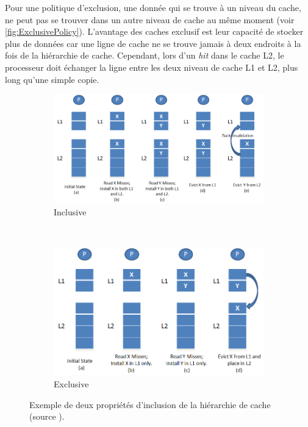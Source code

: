 Pour une politique d'exclusion, une donnée qui se trouve à un niveau du cache, ne peut pas se trouver dans un autre niveau de cache au même moment (voir \autoref{fig:ExclusivePolicy}). L'avantage des caches exclusif est leur capacité de stocker plus de données car une ligne de cache ne se trouve jamais à deux endroits à la fois de la hiérarchie de cache. Cependant, lors d'un \textit{hit} dans le cache L2, le processeur doit échanger la ligne entre les deux niveau de cache L1 et L2, plus long qu'une simple copie.



\begin{figure}
    \centering
    \begin{subfigure}[b]{0.45\linewidth}
        \includegraphics[width=\linewidth]{images/InclusivePolicy.png}
        \caption{Inclusive}
        \label{pic:InclusivePolicy}
    \end{subfigure}
    ~ %
    \begin{subfigure}[b]{0.45\linewidth}
        \includegraphics[width=0.85\linewidth]{images/ExclusivePolicy.png}
        \caption{Exclusive}
        \label{pic:ExclusivePolicy}
    \end{subfigure}
    \caption{Exemple de deux propriétés d'inclusion de la hiérarchie de cache (source \cite{wikipedia_2019}). }\label{fig:cacheinclusionpolicy}
\end{figure}






